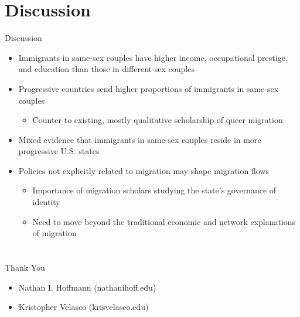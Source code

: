 \documentclass[
  ignorenonframetext,
]{beamer}
\providecommand{\tightlist}{%
  \setlength{\itemsep}{0pt}\setlength{\parskip}{0pt}}
\begin{document}
\hypertarget{discussion}{%
\section{Discussion}\label{discussion}}

\begin{frame}{Discussion}
\protect\hypertarget{discussion-1}{}
\begin{itemize}
\tightlist
\item
  Immigrants in same-sex couples have higher income, occupational
  prestige, and education than those in different-sex couples
\item
  Progressive countries send higher proportions of immigrants in
  same-sex couples

  \begin{itemize}
  \tightlist
  \item
    Counter to existing, mostly qualitative scholarship of queer
    migration
  \end{itemize}
\item
  Mixed evidence that immigrants in same-sex couples reside in more
  progressive U.S. states
\item
  Policies not explicitly related to migration may shape migration flows

  \begin{itemize}
  \tightlist
  \item
    Importance of migration scholars studying the state's governance of
    identity
  \item
    Need to move beyond the traditional economic and network
    explanations of migration
  \end{itemize}
\end{itemize}
\end{frame}

\hypertarget{section}{%
\section{}\label{section}}

\begin{frame}{}
\begin{center}
  \huge{\textcolor{uclablue}{Thank You}}
\end{center}

\begin{itemize}
\tightlist
\item
  Nathan I. Hoffmann (\textcolor{uclablue}{nathanihoff\@ucla.edu})
\item
  Kristopher Velasco (\textcolor{uclablue}{krisvelasco\@utexas.edu})
\end{itemize}
\end{frame}
\end{document}
